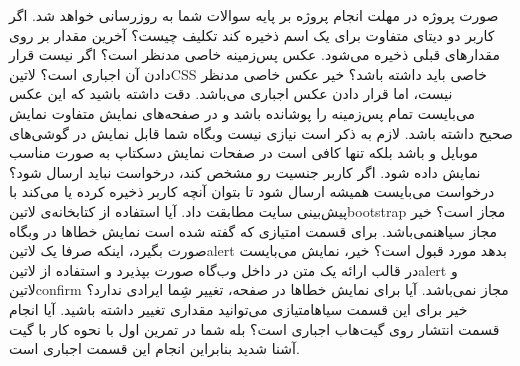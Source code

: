 \documentclass[../main.tex]{subfiles}
\begin{document}
صورت پروژه در مهلت انجام پروژه بر پایه سوالات شما به روزرسانی خواهد شد.
 اگر کاربر دو دیتای متفاوت برای یک اسم ذخیره کند تکلیف چیست؟
 آخرین مقدار بر روی مقدارهای قبلی ذخیره می‌شود.
 عکس پس‌زمینه خاصی مدنظر است؟ اگر نیست قرار دادن آن اجباری است؟ ‌لاتین{CSS} خاصی باید داشته باشد؟
 خیر عکس خاصی مدنظر نیست، اما قرار دادن عکس اجباری می‌باشد. دقت داشته باشید که این عکس می‌بایست تمام پس‌زمینه را پوشانده باشد و در صفحه‌های نمایش متفاوت نمایش صحیح داشته باشد. لازم به ذکر است نیازی نیست وبگاه شما قابل نمایش در گوشی‌های موبایل و  باشد بلکه تنها کافی است در صفحات نمایش دسکتاپ به صورت مناسب نمایش داده شود.
 اگر کاربر جنسیت رو مشخص کند، درخواست نباید ارسال شود؟
 درخواست می‌بایست همیشه ارسال شود تا بتوان آنچه کاربر ذخیره کرده یا می‌کند با پیش‌بینی سایت مطابقت داد.
 آیا استفاده از کتابخانه‌ی ‌لاتین{bootstrap} مجاز است؟
 خیر مجاز ‌سیاه{نمی‌باشد}.
 برای قسمت امتیازی که گفته شده است نمایش خطاها در وبگاه صورت بگیرد، اینکه صرفا یک ‌لاتین{alert} بدهد مورد قبول است؟
 خیر، نمایش می‌بایست در قالب ارائه یک متن در داخل وب‌گاه صورت بپذیرد و استفاده از ‌لاتین{alert} و ‌لاتین{confirm} مجاز نمی‌باشد.
 آیا برای نمایش خطاها در صفحه، تغییر شِما ایرادی ندارد؟
 خیر برای این قسمت ‌سیاه{امتیازی} می‌توانید مقداری تغییر داشته باشید.
 آیا انجام قسمت انتشار روی گیت‌هاب اجباری است؟
 بله شما در تمرین اول با نحوه کار با گیت آشنا شدید بنابراین انجام این قسمت اجباری است.
\end{document}
